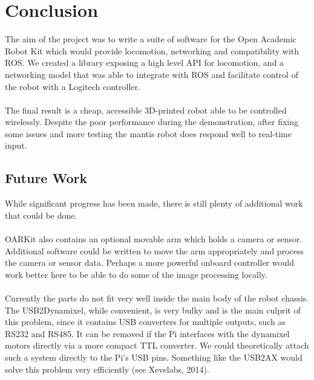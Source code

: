 \documentclass[]{article}
\begin{document}
\section{Conclusion}
The aim of the project was to write a suite of software for the Open Academic Robot Kit which would provide locomotion, networking and compatibility with ROS. We created a library exposing a high level API for locomotion, and a networking model that was able to integrate with ROS and facilitate control of the robot with a Logitech controller.
\\
\\
The final result is a cheap, accessible 3D-printed robot able to be controlled wirelessly. Despite the poor performance during the demonstration, after fixing some issues and more testing the mantis robot does respond well to real-time input.

\subsection{Future Work}
While significant progress has been made, there is still plenty of additional work that could be done.
\\
\\
OARKit also contains an optional movable arm which holds a camera or sensor. Additional software could be written to move the arm appropriately and process the camera or sensor data. Perhaps a more powerful onboard controller would work better here to be able to do some of the image processing locally.
\\
\\
Currently the parts do not fit very well inside the main body of the robot chassis. The USB2Dynamixel, while convenient, is very bulky and is the main culprit of this problem, since it contains USB converters for multiple outputs, such as RS232 and RS485. It can be removed if the Pi interfaces with the dynamixel motors directly via a more compact TTL converter. We could theoretically attach such a system directly to the Pi's USB pins. Something like the USB2AX would solve this problem very efficiently (see Xevelabs, 2014).
\end{document}
